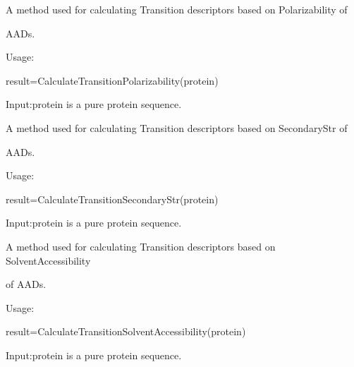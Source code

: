 \documentclass[letterpaper,10pt,english]{sphinxmanual}
\begin{document}

\begin{fulllineitems}
\label{reference/CTD:CTD.CalculateTransitionPolarizability}
A method used for calculating Transition descriptors based on Polarizability of

AADs.

Usage:

result=CalculateTransitionPolarizability(protein)

Input:protein is a pure protein sequence.

\end{fulllineitems}


\begin{fulllineitems}
\label{reference/CTD:CTD.CalculateTransitionSecondaryStr}
A method used for calculating Transition descriptors based on SecondaryStr of

AADs.

Usage:

result=CalculateTransitionSecondaryStr(protein)

Input:protein is a pure protein sequence.

\end{fulllineitems}


\begin{fulllineitems}
\label{reference/CTD:CTD.CalculateTransitionSolventAccessibility}
A method used for calculating Transition descriptors based on SolventAccessibility

of  AADs.

Usage:

result=CalculateTransitionSolventAccessibility(protein)

Input:protein is a pure protein sequence.

\end{fulllineitems}

\end{document}

